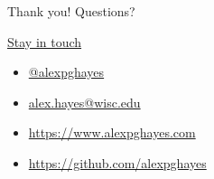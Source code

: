 \documentclass[aspectratio=169]{beamer}
\theoremstyle{remark}
\begin{document}
\begin{frame}{Thank you! Questions?}
    
    \underline{Stay in touch}
    
    \begin{itemize}
        \item[]  \href{https://twitter.com/alexpghayes}{@alexpghayes}
        \item[]  \href{mailto:alex.hayes@wisc.edu}{alex.hayes@wisc.edu}
        \item[]  \url{https://www.alexpghayes.com}
        \item[]  \url{https://github.com/alexpghayes}
    \end{itemize}
    
\end{frame}

\appendix



\end{document}

